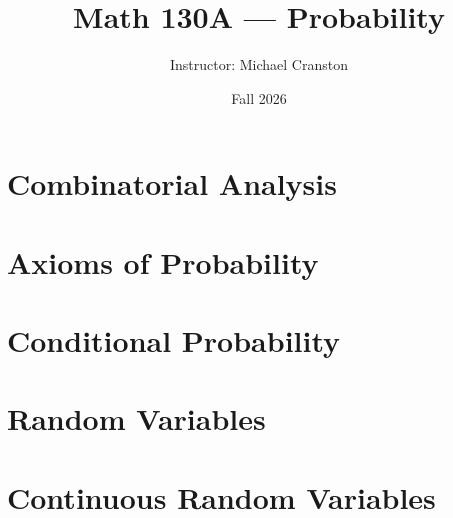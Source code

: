 \documentclass[11pt]{article}
\title{Math 130A --- Probability}
\author{Instructor: Michael Cranston}
\date{Fall 2026}
\begin{document}
\maketitle
\tableofcontents
\newpage

\section{Combinatorial Analysis}


\section{Axioms of Probability}


\newpage
\section{Conditional Probability}


\newpage
\section{Random Variables}


\newpage
\section{Continuous Random Variables}

\end{document}
